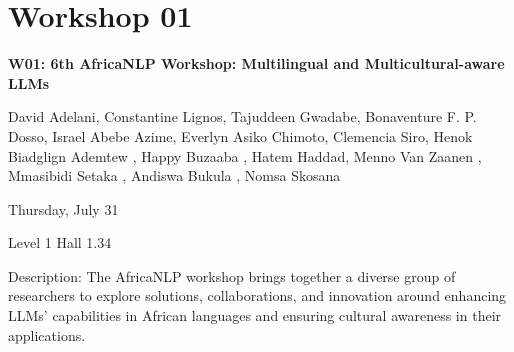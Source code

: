 
\clearpage



\section[W01: 6th AfricaNLP Workshop: Multilingual and Multicultural-aware LLMs]{Workshop 01}
\label{workshop_1}

\begin{center}
    {\Large \textbf{W01: 6th AfricaNLP Workshop: Multilingual and Multicultural-aware LLMs}}

    David Adelani, Constantine Lignos, Tajuddeen Gwadabe, Bonaventure F. P. Dosso, Israel Abebe Azime, Everlyn Asiko Chimoto, Clemencia Siro, Henok Biadglign Ademtew , Happy Buzaaba , Hatem Haddad, Menno Van Zaanen , Mmasibidi Setaka , Andiswa Bukula , Nomsa Skosana

    Thursday, July 31
    
    Level 1 Hall 1.34

\end{center}

Description: The AfricaNLP workshop brings together a diverse group of researchers to explore solutions, collaborations, and innovation around enhancing LLMs’ capabilities in African languages and ensuring cultural awareness in their applications. 

